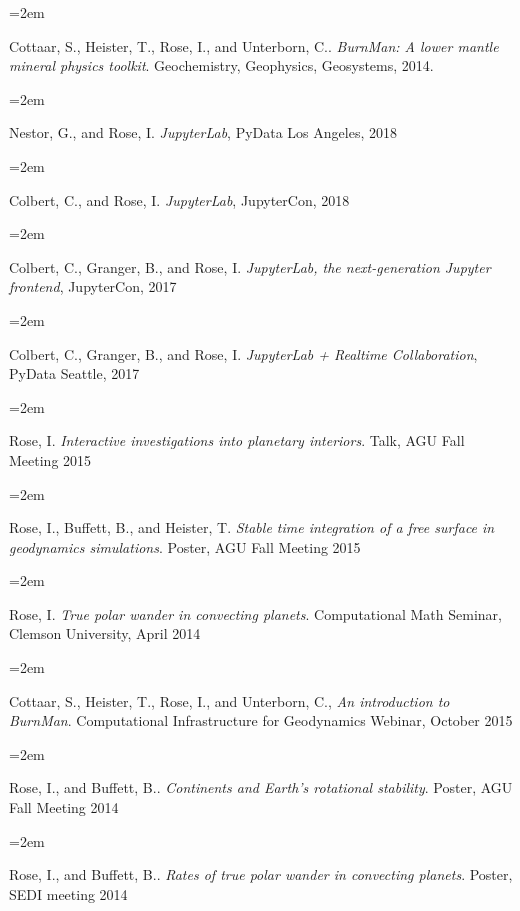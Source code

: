 \documentclass{scrartcl}
\newcommand{\Description}[1]{\hangindent=2em\hangafter=0\noindent\raggedright\footnotesize{#1}\par\normalsize\vspace{1em}} %
\begin{document}
\begin{cv}{\hspace{-4em} }

\Description{Cottaar, S., Heister, T., Rose, I., and Unterborn, C.. \textit{BurnMan: A lower mantle mineral physics toolkit}. Geochemistry, Geophysics, Geosystems, 2014.}


\vspace{1em} %



\noindent{}\vspace{1em}


\vspace{1em} %

\Description{Nestor, G., and Rose, I. \textit{JupyterLab}, PyData Los Angeles, 2018}
\Description{Colbert, C., and Rose, I. \textit{JupyterLab}, JupyterCon, 2018}
\Description{Colbert, C., Granger, B., and Rose, I. \textit{JupyterLab, the next-generation Jupyter frontend}, JupyterCon, 2017}
\Description{Colbert, C., Granger, B., and Rose, I. \textit{JupyterLab + Realtime Collaboration}, PyData Seattle, 2017}
\Description{Rose, I. \textit{Interactive investigations into planetary interiors}. Talk, AGU Fall Meeting 2015}
\Description{Rose, I., Buffett, B., and Heister, T. \textit{Stable time integration of a free surface in geodynamics simulations}. Poster, AGU Fall Meeting 2015}
\Description{Rose, I. \textit{True polar wander in convecting planets}. Computational Math Seminar, Clemson University, April 2014}
\Description{Cottaar, S., Heister, T., Rose, I., and Unterborn, C., \textit{An introduction to BurnMan}. Computational Infrastructure for Geodynamics Webinar, October 2015}
\Description{Rose, I., and Buffett, B.. \textit{Continents and Earth's rotational stability}. Poster, AGU Fall Meeting 2014}
\Description{Rose, I., and Buffett, B.. \textit{Rates of true polar wander in convecting planets}. Poster, SEDI meeting 2014}



\date{}
\end{cv}
\end{document}

